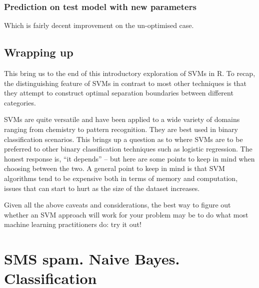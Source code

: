 \documentclass[]{book}
\newenvironment{Shaded}{\begin{snugshade}}{\end{snugshade}}
\newcommand{\CommentTok}[1]{\textcolor[rgb]{0.56,0.35,0.01}{\textit{#1}}}
\newcommand{\KeywordTok}[1]{\textcolor[rgb]{0.13,0.29,0.53}{\textbf{#1}}}
\newcommand{\NormalTok}[1]{#1}
\newcommand{\OperatorTok}[1]{\textcolor[rgb]{0.81,0.36,0.00}{\textbf{#1}}}
\begin{document}
\hypertarget{prediction-on-test-model-with-new-parameters-1}{%
\subsection{Prediction on test model with new parameters}\label{prediction-on-test-model-with-new-parameters-1}}

\begin{Shaded}
\end{Shaded}

Which is fairly decent improvement on the un-optimised case.

\hypertarget{wrapping-up-1}{%
\section{Wrapping up}\label{wrapping-up-1}}

This bring us to the end of this introductory exploration of SVMs in R. To recap, the distinguishing feature of SVMs in contrast to most other techniques is that they attempt to construct optimal separation boundaries between different categories.

SVMs are quite versatile and have been applied to a wide variety of domains ranging from chemistry to pattern recognition. They are best used in binary classification scenarios. This brings up a question as to where SVMs are to be preferred to other binary classification techniques such as logistic regression. The honest response is, ``it depends'' -- but here are some points to keep in mind when choosing between the two. A general point to keep in mind is that SVM algorithms tend to be expensive both in terms of memory and computation, issues that can start to hurt as the size of the dataset increases.

Given all the above caveats and considerations, the best way to figure out whether an SVM approach will work for your problem may be to do what most machine learning practitioners do: try it out!

\hypertarget{sms-spam.-naive-bayes.-classification}{%
\chapter{SMS spam. Naive Bayes. Classification}\label{sms-spam.-naive-bayes.-classification}}
\end{document}

